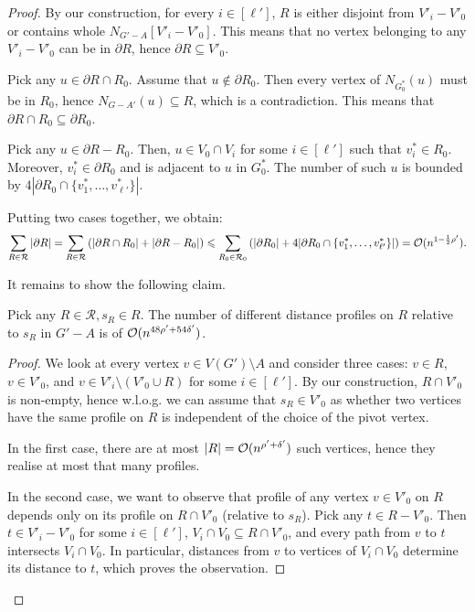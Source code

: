 \begin{proof}
By our construction, for every $i \in [\ell']$, $R$ is either disjoint from $V'_i - V'_0$ or contains whole $N_{G' - A}[V'_i - V'_0]$. This means that no vertex belonging to any $V'_i - V'_0$ can be in $\partial R$, hence $\partial R \subseteq V'_0$.

Pick any $u \in \partial R \cap R_0$. Assume that $u \not\in \partial R_0$. Then every vertex of $N_{G_0^*}(u)$ must be in $R_0$, hence $N_{G - A'}(u) \subseteq R$, which is a contradiction. This means that $\partial R \cap R_0 \subseteq \partial R_0$.

Pick any $u \in \partial R - R_0$. Then, $u \in V_0 \cap V_i$ for some $i \in [\ell']$ such that $v_i^* \in R_0$. Moreover, $v_i^* \in \partial R_0$ and is adjacent to $u$ in $G_0^*$. The number of such $u$ is bounded by $4 |\partial R_0 \cap \{ v_1^*, \dots, v_{\ell'}^* \}|$.

Putting two cases together, we obtain:
$$
\sum_{R \in \mathcal{R}} |\partial R| = \sum_{R \in \mathcal{R}} \left(|\partial R \cap R_0| + |\partial R - R_0|\right) \leqslant \sum_{R_0 \in \mathcal{R}_0} \left(|\partial R_0| + 4 |\partial R_0 \cap \{ v_1^*, \dots, v_{\ell'}^* \}|\right) = \mathcal{O}(n^{1 - \frac{1}{2}\rho'}).
$$

It remains to show the following claim.

\begin{claim}
Pick any $R \in \mathcal{R}, s_R \in R$. The number of different distance profiles on $R$ relative to $s_R$ in $G' - A$ is of $\mathcal{O}(n^{48\rho' + 54\delta'})$.
\end{claim}
\begin{proof}
We look at every vertex $v \in V(G') \setminus A$ and consider three cases: $v \in R$, $v \in V'_0$, and $v \in V'_i \setminus (V'_0 \cup R)$ for some $i \in [\ell']$. By our construction, $R \cap V'_0$ is non-empty, hence w.l.o.g. we can assume that $s_R \in V'_0$ as whether two vertices have the same profile on $R$ is independent of the choice of the pivot vertex.

In the first case, there are at most $|R| = \mathcal{O}(n^{\rho' + \delta'})$ such vertices, hence they realise at most that many profiles.

In the second case, we want to observe that profile of any vertex $v \in V'_0$ on $R$ depends only on its profile on $R \cap V'_0$ (relative to $s_R$). Pick any $t \in R - V'_0$. Then $t \in V'_i - V'_0$ for some $i \in [\ell']$, $V_i \cap V_0 \subseteq R \cap V'_0$, and every path from $v$ to $t$ intersects $V_i \cap V_0$. In particular, distances from $v$ to vertices of $V_i \cap V_0$ determine its distance to $t$, which proves the observation.


\end{proof}
\end{proof}
